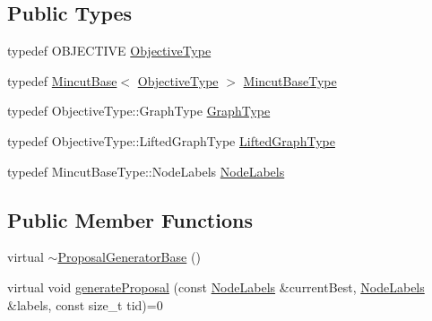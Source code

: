 \subsection*{Public Types}
\begin{DoxyCompactItemize}
\item 
typedef O\+B\+J\+E\+C\+T\+I\+VE \hyperlink{classnifty_1_1graph_1_1opt_1_1mincut_1_1ProposalGeneratorBase_aaec2f06ca64540523eba37fee037b527}{Objective\+Type}
\item 
typedef \hyperlink{classnifty_1_1graph_1_1opt_1_1mincut_1_1MincutBase}{Mincut\+Base}$<$ \hyperlink{classnifty_1_1graph_1_1opt_1_1mincut_1_1ProposalGeneratorBase_aaec2f06ca64540523eba37fee037b527}{Objective\+Type} $>$ \hyperlink{classnifty_1_1graph_1_1opt_1_1mincut_1_1ProposalGeneratorBase_a2fd9fae5a15ac34ddfffaa2c36e48b7a}{Mincut\+Base\+Type}
\item 
typedef Objective\+Type\+::\+Graph\+Type \hyperlink{classnifty_1_1graph_1_1opt_1_1mincut_1_1ProposalGeneratorBase_af97d0dbcc40754191cc6fa0c2baa6018}{Graph\+Type}
\item 
typedef Objective\+Type\+::\+Lifted\+Graph\+Type \hyperlink{classnifty_1_1graph_1_1opt_1_1mincut_1_1ProposalGeneratorBase_ab034c7564972906e2f6e7ca9c0a68437}{Lifted\+Graph\+Type}
\item 
typedef Mincut\+Base\+Type\+::\+Node\+Labels \hyperlink{classnifty_1_1graph_1_1opt_1_1mincut_1_1ProposalGeneratorBase_a8e7bdb52139e951b4d4fc21c3cc6946a}{Node\+Labels}
\end{DoxyCompactItemize}
\subsection*{Public Member Functions}
\begin{DoxyCompactItemize}
\item 
virtual \hyperlink{classnifty_1_1graph_1_1opt_1_1mincut_1_1ProposalGeneratorBase_a771ab8a839ac8091f094daba777f6a84}{$\sim$\+Proposal\+Generator\+Base} ()
\item 
virtual void \hyperlink{classnifty_1_1graph_1_1opt_1_1mincut_1_1ProposalGeneratorBase_a9c2fd90058277ec51ae024110a095860}{generate\+Proposal} (const \hyperlink{classnifty_1_1graph_1_1opt_1_1mincut_1_1ProposalGeneratorBase_a8e7bdb52139e951b4d4fc21c3cc6946a}{Node\+Labels} \&current\+Best, \hyperlink{classnifty_1_1graph_1_1opt_1_1mincut_1_1ProposalGeneratorBase_a8e7bdb52139e951b4d4fc21c3cc6946a}{Node\+Labels} \&labels, const size\+\_\+t tid)=0
\end{DoxyCompactItemize}


